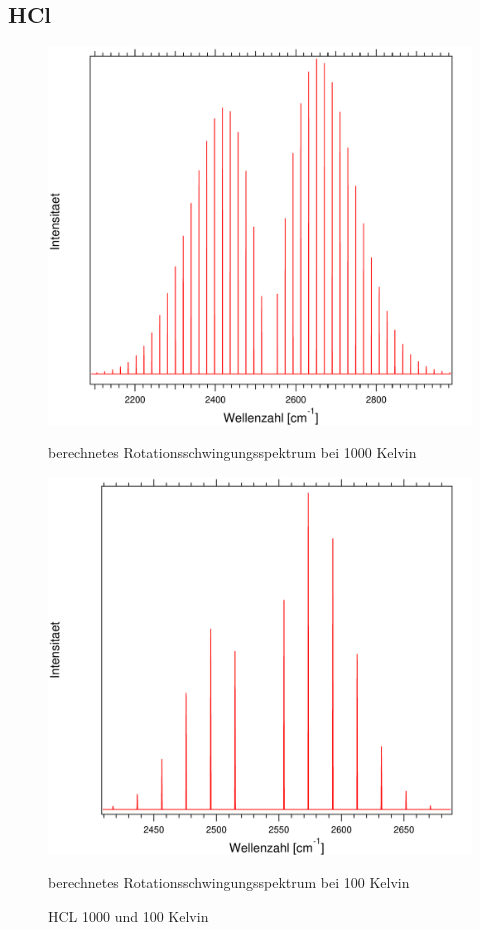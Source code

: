 \subsection*{HCl}

\begin{figure}[H]
	
	\begin{minipage}{0.5\textwidth}
	\includegraphics[width=\textwidth]{Bilder/1000HCL.pdf}
	\caption{berechnetes Rotationsschwingungsspektrum bei 1000 Kelvin}
	\end{minipage}
\begin{minipage}{0.5\textwidth}
	\includegraphics[width=\textwidth]{Bilder/100HCL.pdf}
	\caption{berechnetes Rotationsschwingungsspektrum bei 100 Kelvin}
	\end{minipage}	
	
	\caption{HCL 1000 und 100 Kelvin}
	
	
\end{figure}

